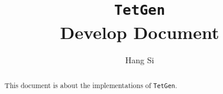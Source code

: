 \documentclass[a4paper,11pt]{report}
\begin{document}
\title{{\tt TetGen}\\ Develop Document}
\author{Hang Si}
\maketitle
\begin{abstract}\centering
This document is about the implementations of {\tt TetGen}.
\end{abstract}
\tableofcontents



\end{document}
